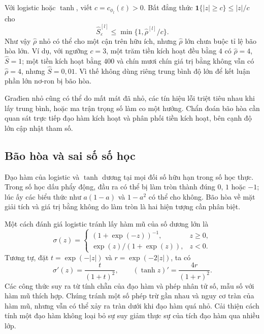 Với logistic hoặc $\tanh$, viết $c=c_{\phi_l}(\varepsilon)>0$.
Bất đẳng thức $\mathbf1\{|z|\geq c\}\leq|z|/c$ cho
\begin{equation}
 \widehat S_{\varepsilon}^{[l]}
 \leq\min\{1,\widehat\rho^{[l]}/c\}.
 \label{kt:eq:rho-bound}
\end{equation}
Như vậy $\widehat\rho$ nhỏ có thể cho một cận trên hữu ích, nhưng
$\widehat\rho$ lớn chưa buộc tỉ lệ bão hòa lớn. Ví dụ, với ngưỡng
$c=3$, một trăm tiền kích hoạt đều bằng $4$ có
$\widehat\rho=4$, $\widehat S=1$; một tiền kích hoạt bằng $400$
và chín mươi chín giá trị bằng không vẫn có $\widehat\rho=4$,
nhưng $\widehat S=0{,}01$. Vì thế không dùng riêng trung bình độ
lớn để kết luận phần lớn nơ-ron bị bão hòa.

Građien nhỏ cũng có thể do mất mát đã nhỏ, các tín hiệu lỗi triệt
tiêu nhau khi lấy trung bình, hoặc ma trận trọng số làm co một
hướng. Chẩn đoán bão hòa cần quan sát trực tiếp đạo hàm kích hoạt
và phân phối tiền kích hoạt, bên cạnh độ lớn cập nhật tham số.

\subsection{Bão hòa và sai số số học}

Đạo hàm của logistic và $\tanh$ dương tại mọi đối số hữu hạn trong
số học thực. Trong số học dấu phẩy động, đầu ra có thể bị làm tròn
thành đúng $0$, $1$ hoặc $-1$; lúc ấy các biểu thức như
$a(1-a)$ và $1-a^2$ có thể cho không. Bão hòa về mặt giải tích và
giá trị bằng không do làm tròn là hai hiện tượng cần phân biệt.

Một cách đánh giá logistic tránh lấy hàm mũ của số dương lớn là
\begin{equation}
 \sigma(z)=
 \begin{cases}
  (1+\exp(-z))^{-1},&z\geq0,\\
  \exp(z)/(1+\exp(z)),&z<0.
 \end{cases}
 \label{kt:eq:stable-sigmoid}
\end{equation}
Tương tự, đặt $t=\exp(-|z|)$ và $r=\exp(-2|z|)$, ta có
\begin{equation}
 \sigma'(z)=\frac{t}{(1+t)^2},\qquad
 (\tanh z)'=\frac{4r}{(1+r)^2}.
 \label{kt:eq:stable-derivatives}
\end{equation}
Các công thức suy ra từ tính chẵn của đạo hàm và phép nhân tử số,
mẫu số với hàm mũ thích hợp. Chúng tránh một số phép trừ gần nhau
và nguy cơ tràn của hàm mũ, nhưng vẫn có thể xảy ra tràn dưới
khi đạo hàm quá nhỏ. Cải thiện cách tính một đạo hàm không
loại bỏ sự suy giảm thực sự của tích đạo hàm qua nhiều lớp.

